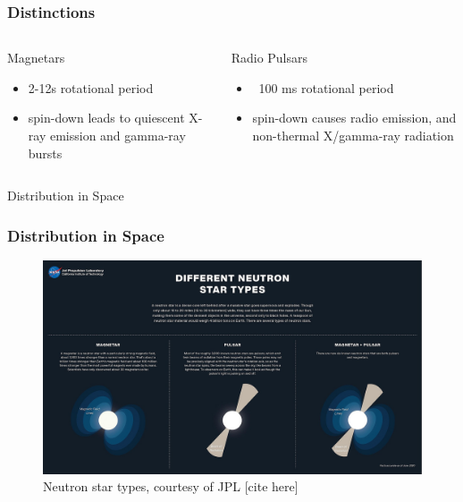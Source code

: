 \documentclass[hyperref=pdftex, presentation]{beamer}
\begin{document}
\begin{frame}{}
\frametitle{\Large Distinctions}
\begin{columns}[c] %

\begin{block}{Magnetars}
\begin{itemize}
 \item<2-> 2-12s rotational period%
 \item<4-> spin-down leads to quiescent X-ray emission and gamma-ray bursts
\end{itemize}
\end{block}
\begin{block}{Radio Pulsars}
\begin{itemize}
	\item<3-> ~100 ms rotational period%
	\item<5-> spin-down causes radio emission, and non-thermal X/gamma-ray radiation
\end{itemize}
\end{block}


\end{columns}
\end{frame}





\begin{frame}{\Large Distribution in Space}
\frametitle{\Large Distribution in Space}

\begin{figure}
	\includegraphics[scale=.17]{figures/neutron_star_types.jpg}
	\caption{Neutron star types, courtesy of JPL [cite here]}
\end{figure}

\end{frame}
\end{document}
